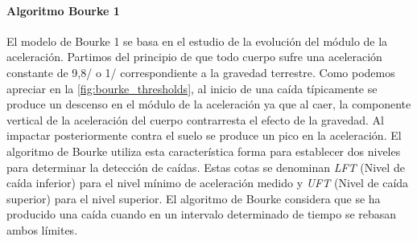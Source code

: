 


\paragraph{Algoritmo Bourke 1} El modelo de Bourke 1\cite{Bourke2006} se basa en el estudio de la evolución del módulo de la aceleración. Partimos del principio de que todo cuerpo sufre una aceleración constante de 9,8/ o 1\g/ correspondiente a la gravedad terrestre. Como podemos apreciar en la \autoref{fig:bourke_thresholds}, al inicio de una caída típicamente se produce un descenso en el módulo de la aceleración ya que al caer, la componente vertical de la aceleración del cuerpo contrarresta el efecto de la gravedad. Al impactar posteriormente contra el suelo se produce un pico en la aceleración. El algoritmo de Bourke utiliza esta característica forma para establecer dos niveles para determinar la detección de caídas. Estas cotas se denominan \textit{LFT} (Nivel de caída inferior) para el nivel mínimo de aceleración medido y \textit{UFT} (Nivel de caída superior) para el nivel superior. El algoritmo de Bourke considera que se ha producido una caída cuando en un intervalo determinado de tiempo se rebasan ambos límites.


